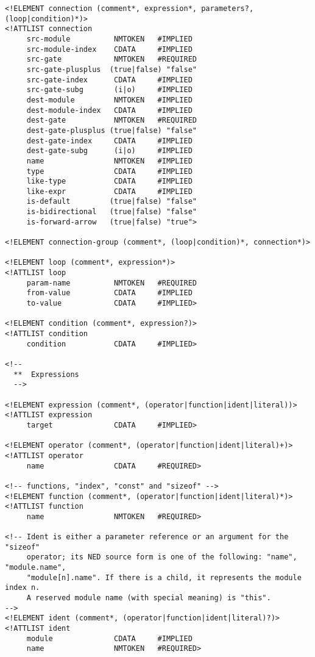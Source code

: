 \begin{verbatim}
<!ELEMENT connection (comment*, expression*, parameters?, (loop|condition)*)>
<!ATTLIST connection
     src-module          NMTOKEN   #IMPLIED
     src-module-index    CDATA     #IMPLIED
     src-gate            NMTOKEN   #REQUIRED
     src-gate-plusplus  (true|false) "false"
     src-gate-index      CDATA     #IMPLIED
     src-gate-subg       (i|o)     #IMPLIED
     dest-module         NMTOKEN   #IMPLIED
     dest-module-index   CDATA     #IMPLIED
     dest-gate           NMTOKEN   #REQUIRED
     dest-gate-plusplus (true|false) "false"
     dest-gate-index     CDATA     #IMPLIED
     dest-gate-subg      (i|o)     #IMPLIED
     name                NMTOKEN   #IMPLIED
     type                CDATA     #IMPLIED
     like-type           CDATA     #IMPLIED
     like-expr           CDATA     #IMPLIED
     is-default         (true|false) "false"
     is-bidirectional   (true|false) "false"
     is-forward-arrow   (true|false) "true">

<!ELEMENT connection-group (comment*, (loop|condition)*, connection*)>

<!ELEMENT loop (comment*, expression*)>
<!ATTLIST loop
     param-name          NMTOKEN   #REQUIRED
     from-value          CDATA     #IMPLIED
     to-value            CDATA     #IMPLIED>

<!ELEMENT condition (comment*, expression?)>
<!ATTLIST condition
     condition           CDATA     #IMPLIED>

<!--
  **  Expressions
  -->

<!ELEMENT expression (comment*, (operator|function|ident|literal))>
<!ATTLIST expression
     target              CDATA     #IMPLIED>

<!ELEMENT operator (comment*, (operator|function|ident|literal)+)>
<!ATTLIST operator
     name                CDATA     #REQUIRED>

<!-- functions, "index", "const" and "sizeof" -->
<!ELEMENT function (comment*, (operator|function|ident|literal)*)>
<!ATTLIST function
     name                NMTOKEN   #REQUIRED>

<!-- Ident is either a parameter reference or an argument for the "sizeof"
     operator; its NED source form is one of the following: "name", "module.name",
     "module[n].name". If there is a child, it represents the module index n.
     A reserved module name (with special meaning) is "this".
-->
<!ELEMENT ident (comment*, (operator|function|ident|literal)?)>
<!ATTLIST ident
     module              CDATA     #IMPLIED
     name                NMTOKEN   #REQUIRED>



\end{verbatim}

